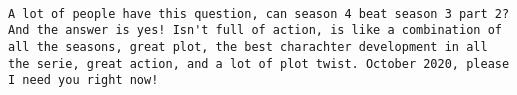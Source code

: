 \documentclass[
]{article}
\begin{document}
\begin{verbatim}
                                                                                                                                                                                                                                                                                                                                                                                                                                                                                                                                                                                                                                                                                                                                                                                                                                                                                                                                                                                                                                                                                                                                                                                                                                                                                                                                                                                                                                                                                                                                                                                                                                                                                                                                                                                                                                                                                                                                                                                                                                                                                                                                                                                                                                                                                                                                                                                                                                                                                                                                                                                                                                                                                                                                                                                                                                                                                                                                                  A lot of people have this question, can season 4 beat season 3 part 2? And the answer is yes! Isn't full of action, is like a combination of all the seasons, great plot, the best charachter development in all the serie, great action, and a lot of plot twist. October 2020, please I need you right now!

\end{verbatim}
\end{document}
